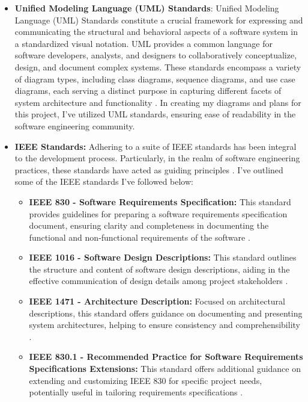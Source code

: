 \begin{itemize}
    \item \textbf{Unified Modeling Language (UML) Standards}: Unified Modeling Language (UML) Standards constitute a crucial framework for expressing and communicating the structural and behavioral aspects of a software system in a standardized visual notation. UML provides a common language for software developers, analysts, and designers to collaboratively conceptualize, design, and document complex systems. These standards encompass a variety of diagram types, including class diagrams, sequence diagrams, and use case diagrams, each serving a distinct purpose in capturing different facets of system architecture and functionality \cite{UML}. In creating my diagrams and plans for this project, I've utilized UML standards, ensuring ease of readability in the software engineering community.
    \item \textbf{IEEE Standards:} Adhering to a suite of IEEE standards has been integral to the development process. Particularly, in the realm of software engineering practices, these standards have acted as guiding principles \cite{IEEEStd}. I've outlined some of the IEEE standards I've followed below:
        \begin{itemize}
        \item \textbf{IEEE 830 - Software Requirements Specification:}
        This standard provides guidelines for preparing a software requirements specification document, ensuring clarity and completeness in documenting the functional and non-functional requirements of the software \cite{IEEE830}.
        \item \textbf{IEEE 1016 - Software Design Descriptions:}
        This standard outlines the structure and content of software design descriptions, aiding in the effective communication of design details among project stakeholders \cite{IEEE1016}.
        \item \textbf{IEEE 1471 - Architecture Description:}
        Focused on architectural descriptions, this standard offers guidance on documenting and presenting system architectures, helping to ensure consistency and comprehensibility \cite{IEEE1471}.
        \item \textbf{IEEE 830.1 - Recommended Practice for Software Requirements Specifications Extensions:}
        This standard offers additional guidance on extending and customizing IEEE 830 for specific project needs, potentially useful in tailoring requirements specifications \cite{IEEE830.1}.
        \end{itemize}

\end{itemize}
